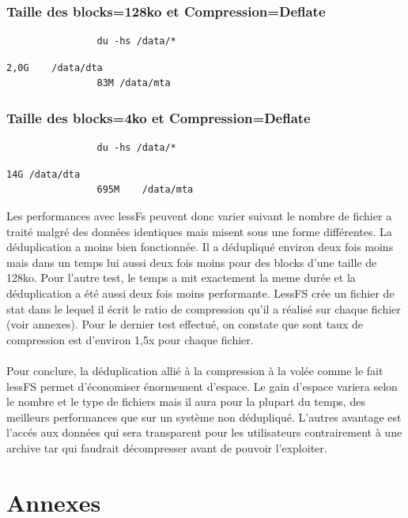 \documentclass[a4paper]{report}
\begin{document}
			\subsection{Taille des blocks=128ko et Compression=Deflate}
			\begin{lstlisting}
				du -hs /data/*
			\end{lstlisting}
			\begin{lstlisting}[backgroundcolor=\color{yellow}]
				2,0G	/data/dta
				83M	/data/mta
			\end{lstlisting}
			\subsection{Taille des blocks=4ko et Compression=Deflate}
			\begin{lstlisting}
				du -hs /data/*
			\end{lstlisting}
			\begin{lstlisting}[backgroundcolor=\color{yellow}]
				14G	/data/dta
				695M	/data/mta
			\end{lstlisting}
			
			Les performances avec lessFs peuvent donc varier suivant le nombre de fichier a traité malgré des données identiques mais misent sous une forme différentes. La déduplication a moins bien fonctionnée. Il a dédupliqué environ deux fois moins mais dans un temps lui aussi deux fois moins pour des blocks d'une taille de 128ko. Pour l'autre test, le temps a mit exactement la meme durée et la déduplication a été aussi deux fois moins performante. LessFS crée un fichier de stat dans le lequel il écrit le ratio de compression qu'il a réalisé sur chaque fichier (voir annexes). Pour le  dernier test effectué, on constate que sont taux de compression est d'environ 1,5x pour chaque fichier.\\\\
			Pour conclure, la déduplication allié à la compression à la volée comme le fait lessFS permet d'économiser énormement d'espace. Le gain d'espace variera selon le nombre et le type de fichiers mais il aura pour la plupart du temps, des meilleurs performances que sur un système non dédupliqué. L'autres avantage est l'accés aux données qui sera transparent pour les utilisateurs contrairement à une archive tar qui faudrait décompresser avant de pouvoir l'exploiter.

\chapter{Annexes}
\end{document}
